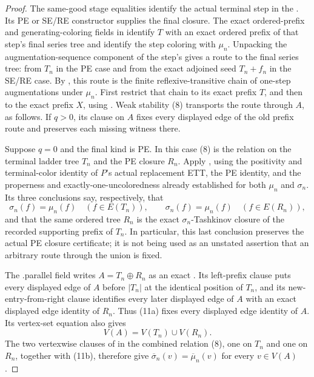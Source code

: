 \begin{proof}
The same-good stage equalities identify the actual terminal step in the
.  Its PE or SE/RE
 constructor supplies the final closure.
The exact ordered-prefix and generating-coloring fields in
 identify \(T\) with an exact ordered
prefix of that step's final series tree and identify the step coloring with
\(\mu_n\).  Unpacking the augmentation-sequence component of the step's
 gives a route to the final series tree: from
\(T_n\) in the PE case and from the exact adjoined seed \(T_n+f_n\) in the
SE/RE case.  By
, this route is the finite
reflexive-transitive chain of one-step augmentations under \(\mu_n\).
First restrict that chain to its exact prefix \(T\), and then to the exact
prefix \(X\), using
.  Weak stability (8)
transports the route through \(A\), as follows.  If \(q>0\), its
 clause on \(A\) fixes every displayed
edge of the old prefix route and preserves each missing witness there.

Suppose \(q=0\) and the final kind is PE.  In this case (8) is the
 relation on the terminal ladder tree
\(T_n\) and the PE closure \(R_n\).  Apply
, using the positivity and
terminal-color identity of \(P\)'s actual replacement ETT, the PE
identity, and the properness and exactly-one-uncoloredness already
established for both \(\mu_n\) and \(\sigma_n\).  Its three conclusions
say, respectively, that
\[
 \sigma_n(f)=\mu_n(f)\quad(f\in E(T_n)),\qquad
 \sigma_n(f)=\mu_n(f)\quad(f\in E(R_n)),                    \tag{11a}
\]
and that the same ordered tree \(R_n\) is the exact
\(\sigma_n\)-Tashkinov closure of the recorded supporting prefix of
\(T_n\).  In particular, this last conclusion preserves the actual PE
closure certificate; it is not being used as an unstated assertion that
an arbitrary route through the union is fixed.

The .parallel field writes
\(A=T_n\oplus R_n\) as an exact .  Its
left-prefix clause puts every displayed edge of \(A\) before
\(|T_n|\) at the identical position of \(T_n\), and its
new-entry-from-right clause identifies every later displayed edge of
\(A\) with an exact displayed edge identity of \(R_n\).  Thus (11a)
fixes every displayed edge identity of \(A\).  Its vertex-set equation
also gives
\[
                         V(A)=V(T_n)\cup V(R_n).              \tag{11b}
\]
The two vertexwise clauses of  in the combined
relation (8), one on \(T_n\) and one on \(R_n\), together with (11b),
therefore give
\(\overline\sigma_n(v)=\overline\mu_n(v)\) for every \(v\in V(A)\).


\end{proof}
